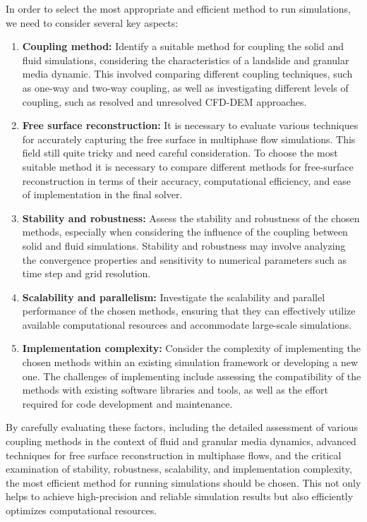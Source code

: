 In order to select the most appropriate and efficient method to run simulations, we need to consider several key aspects:
\begin{enumerate}
    \item \textbf{Coupling method:} Identify a suitable method for coupling the solid and fluid simulations, considering the characteristics of a landslide and granular media dynamic. This involved comparing different coupling techniques, such as one-way and two-way coupling, as well as investigating different levels of coupling, such as resolved and unresolved CFD-DEM approaches.
    \item \textbf{Free surface reconstruction:} It is necessary to evaluate various techniques for accurately capturing the free surface in multiphase flow simulations. This field still quite tricky and need careful consideration. To choose the most suitable method it is necessary to compare different methods for free-surface reconstruction in terms of their accuracy, computational efficiency, and ease of implementation in the final solver.
    \item \textbf{Stability and robustness:} Assess the stability and robustness of the chosen methods, especially when considering the influence of the coupling between solid and fluid simulations. Stability and robustness may involve analyzing the convergence properties and sensitivity to numerical parameters such as time step and grid resolution.
    \item \textbf{Scalability and parallelism:} Investigate the scalability and parallel performance of the chosen methods, ensuring that they can effectively utilize available computational resources and accommodate large-scale simulations.
    \item \textbf{Implementation complexity:} Consider the complexity of implementing the chosen methods within an existing simulation framework or developing a new one. The challenges of implementing include assessing the compatibility of the methods with existing software libraries and tools, as well as the effort required for code development and maintenance.
\end{enumerate}

By carefully evaluating these factors, including the detailed assessment of various coupling methods in the context of fluid and granular media dynamics, advanced techniques for free surface reconstruction in multiphase flows, and the critical examination of stability, robustness, scalability, and implementation complexity, the most efficient method for running simulations should be chosen. This not only helps to achieve high-precision and reliable simulation results but also efficiently optimizes computational resources.

